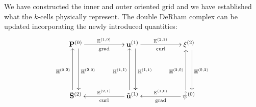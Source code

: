 We have constructed the inner and outer oriented grid and we have established what the $k$-cells physically represent. The double DeRham complex can be updated incorporating the newly introduced quantities:
\begin{equation}
    \begin{gathered}
        \xymatrix@=13ex{
            \mathbf{P}^{(0)} \ar[r]^{\mathbb{E}^{(1,0)}}_{\text{grad}} \ar@<1ex>[d]^{\mathbb{H}^{(\tilde{2},0)}} & \mathbf{u}^{(1)} \ar[r]^{\mathbb{E}^{(2,1)}}_{\text{curl}} \ar@<1ex>[d]^{\mathbb{H}^{(\tilde{1},1)}} & \mathbf{\xi}^{(2)} \ar@<1ex>[d]^{\mathbb{H}^{(\tilde{0},2)}} \\
            \mathbf{\tilde{S}}^{(2)} \ar@<1ex>[u]^{\mathbb{H}^{(0,\tilde{2})}} & \mathbf{\tilde{u}}^{(1)} \ar[l]_{\tilde{\mathbb{E}}^{(2, 1)}}^{\text{curl}} \ar@<1ex>[u]^{\mathbb{H}^{(1,\tilde{1})}} & \mathbf{\tilde{\psi}}^{(0)} \ar[l]_{\tilde{\mathbb{E}}^{(1,0)}}^{\text{grad}} \ar@<1ex>[u]^{\mathbb{H}^{(2,\tilde{0})}}
        }
    \end{gathered}
\end{equation}
